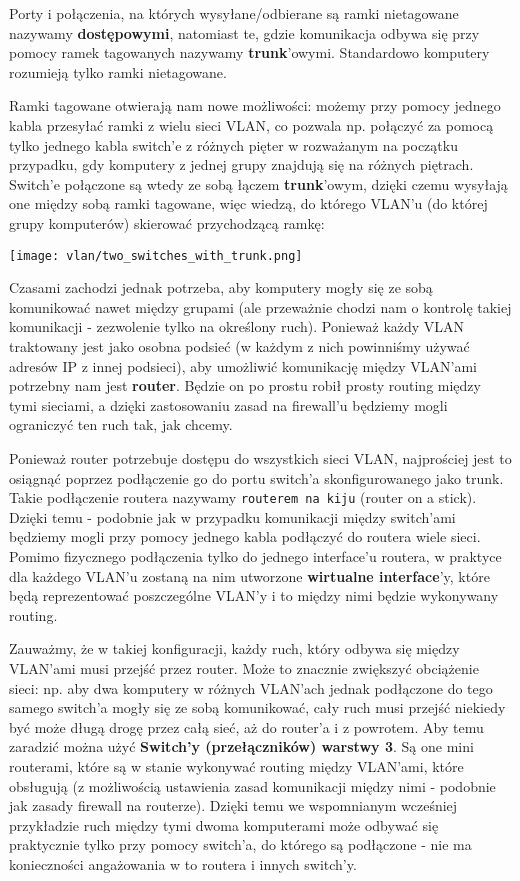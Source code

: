 \documentclass[main.tex]{subfiles}
\begin{document}
    Porty i połączenia, na których wysyłane/odbierane są ramki nietagowane nazywamy \textbf{dostępowymi}, natomiast te, gdzie komunikacja odbywa się
    przy pomocy ramek tagowanych nazywamy \textbf{trunk}'owymi. Standardowo komputery rozumieją tylko ramki nietagowane.

    Ramki tagowane otwierają nam nowe możliwości: możemy przy pomocy jednego kabla przesyłać ramki z wielu sieci VLAN, co pozwala np. połączyć za pomocą tylko jednego kabla
    switch'e z różnych pięter w rozważanym na początku przypadku, gdy komputery z jednej grupy znajdują się na różnych piętrach. Switch'e połączone są wtedy ze sobą łączem
    \textbf{trunk}'owym, dzięki czemu wysyłają one między sobą ramki tagowane, więc wiedzą, do którego VLAN'u (do której grupy komputerów) skierować przychodzącą ramkę:

    \bigskip
    \texttt{[image: vlan/two\_switches\_with\_trunk.png]}
    \bigskip

    \newpage
    Czasami zachodzi jednak potrzeba, aby komputery mogły się ze sobą komunikować nawet między grupami (ale przeważnie chodzi nam o kontrolę takiej komunikacji
    - zezwolenie tylko na określony ruch). Ponieważ każdy VLAN traktowany jest jako osobna podsieć (w każdym z nich powinniśmy używać adresów IP z innej podsieci),
    aby umożliwić komunikację między VLAN'ami potrzebny nam jest \textbf{router}. Będzie on po prostu robił prosty routing między tymi sieciami, a dzięki zastosowaniu
    zasad na firewall'u będziemy mogli ograniczyć ten ruch tak, jak chcemy.

    Ponieważ router potrzebuje dostępu do wszystkich sieci VLAN, najprościej jest to osiągnąć poprzez podłączenie go do portu switch'a skonfigurowanego jako trunk.
    Takie podłączenie routera nazywamy \texttt{routerem na kiju} (router on a stick).
    Dzięki temu - podobnie jak w przypadku komunikacji między switch'ami będziemy mogli przy pomocy jednego kabla podłączyć do routera wiele sieci. Pomimo fizycznego
    podłączenia tylko do jednego interface'u routera, w praktyce dla każdego VLAN'u zostaną na nim utworzone \textbf{wirtualne interface}'y,
    które będą reprezentować poszczególne VLAN'y i to między nimi będzie wykonywany routing.

    Zauważmy, że w takiej konfiguracji, każdy ruch, który odbywa się między VLAN'ami musi przejść przez router. Może to znacznie zwiększyć obciążenie sieci:
    np. aby dwa komputery w różnych VLAN'ach jednak podłączone do tego samego switch'a mogły się ze sobą komunikować, cały ruch musi przejść niekiedy być może
    długą drogę przez całą sieć, aż do router'a i z powrotem. Aby temu zaradzić można użyć \textbf{Switch'y (przełączników) warstwy 3}. Są one mini routerami,
    które są w stanie wykonywać routing między VLAN'ami, które obsługują (z możliwością ustawienia zasad komunikacji między nimi - podobnie jak zasady firewall na routerze).
    Dzięki temu we wspomnianym wcześniej przykładzie ruch między tymi dwoma komputerami może odbywać się praktycznie tylko przy pomocy switch'a, do którego są podłączone
    - nie ma konieczności angażowania w to routera i innych switch'y.
\end{document}
